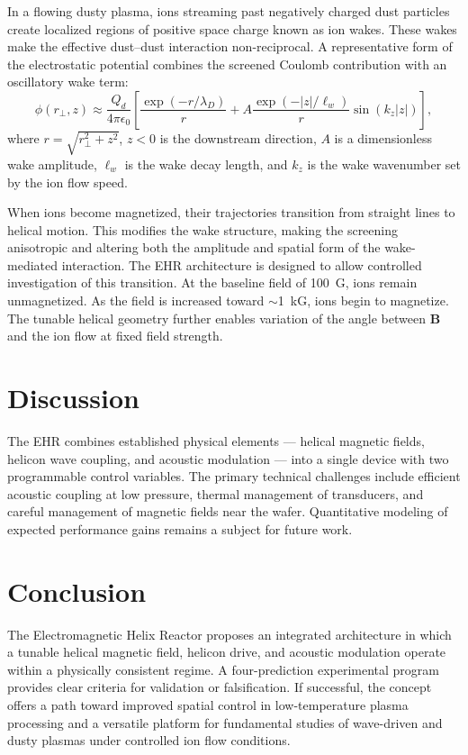 \documentclass[11pt]{article}
\begin{document}
In a flowing dusty plasma, ions streaming past negatively charged dust particles create localized regions of positive space charge known as ion wakes. These wakes make the effective dust–dust interaction non-reciprocal. A representative form of the electrostatic potential combines the screened Coulomb contribution with an oscillatory wake term:
\begin{equation}
\phi(r_\perp, z) \approx \frac{Q_d}{4\pi\epsilon_0} \left[
\frac{\exp(-r/\lambda_D)}{r}
+ A \frac{\exp(-|z|/\ell_w)}{r} \sin(k_z |z|)
\right],
\label{eq:wake}
\end{equation}
where $r = \sqrt{r_\perp^2 + z^2}$, $z < 0$ is the downstream direction, $A$ is a dimensionless wake amplitude, $\ell_w$ is the wake decay length, and $k_z$ is the wake wavenumber set by the ion flow speed.

When ions become magnetized, their trajectories transition from straight lines to helical motion. This modifies the wake structure, making the screening anisotropic and altering both the amplitude and spatial form of the wake-mediated interaction. The EHR architecture is designed to allow controlled investigation of this transition. At the baseline field of 100~G, ions remain unmagnetized. As the field is increased toward $\sim$1~kG, ions begin to magnetize. The tunable helical geometry further enables variation of the angle between $\mathbf{B}$ and the ion flow at fixed field strength.

\section{Discussion}

The EHR combines established physical elements — helical magnetic fields, helicon wave coupling, and acoustic modulation — into a single device with two programmable control variables. The primary technical challenges include efficient acoustic coupling at low pressure, thermal management of transducers, and careful management of magnetic fields near the wafer. Quantitative modeling of expected performance gains remains a subject for future work.

\section{Conclusion}

The Electromagnetic Helix Reactor proposes an integrated architecture in which a tunable helical magnetic field, helicon drive, and acoustic modulation operate within a physically consistent regime. A four-prediction experimental program provides clear criteria for validation or falsification. If successful, the concept offers a path toward improved spatial control in low-temperature plasma processing and a versatile platform for fundamental studies of wave-driven and dusty plasmas under controlled ion flow conditions.
\end{document}
